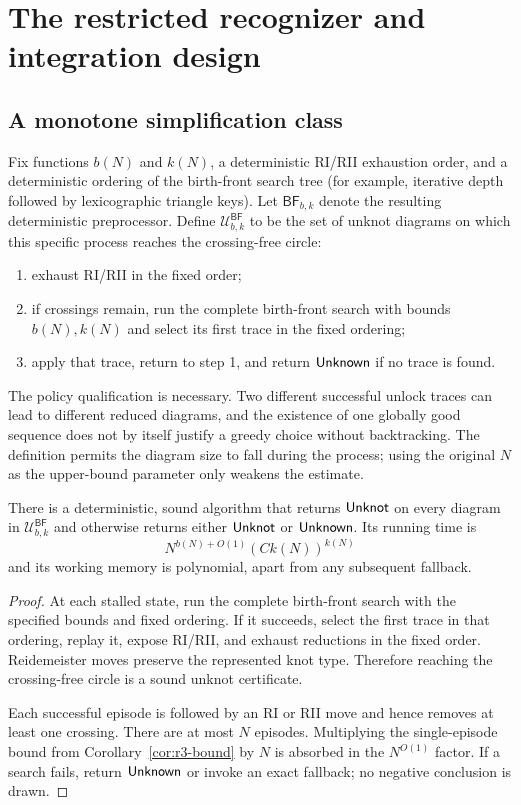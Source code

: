\section{The restricted recognizer and integration design}
\label{sec:algorithm}

\subsection{A monotone simplification class}

Fix functions $b(N)$ and $k(N)$, a deterministic RI/RII exhaustion order,
and a deterministic ordering of the birth-front search tree (for example,
iterative depth followed by lexicographic triangle keys).  Let
$\mathsf{BF}_{b,k}$ denote the resulting deterministic preprocessor.  Define
$\mathcal{U}^{\mathsf{BF}}_{b,k}$ to be the set of unknot diagrams on which this
specific process reaches the crossing-free circle:
\begin{enumerate}
\item exhaust RI/RII in the fixed order;
\item if crossings remain, run the complete birth-front search with bounds
      $b(N),k(N)$ and select its first trace in the fixed ordering;
\item apply that trace, return to step 1, and return $\mathsf{Unknown}$ if no trace is
      found.
\end{enumerate}
The policy qualification is necessary.  Two different successful unlock traces
can lead to different reduced diagrams, and the existence of one globally good
sequence does not by itself justify a greedy choice without backtracking.  The
definition permits the diagram size to fall during the process; using the
original $N$ as the upper-bound parameter only weakens the estimate.

\begin{theorem}
\label{thm:restricted-recognition}
There is a deterministic, sound algorithm that returns $\mathsf{Unknot}$ on every diagram
in $\mathcal{U}^{\mathsf{BF}}_{b,k}$ and otherwise returns either $\mathsf{Unknot}$ or $\mathsf{Unknown}$.  Its
running time is
\[
  N^{b(N)+O(1)}(Ck(N))^{k(N)}
\]
and its working memory is polynomial, apart from any subsequent fallback.
\end{theorem}

\begin{proof}
At each stalled state, run the complete birth-front search with the specified
bounds and fixed ordering.  If it succeeds, select the first trace in that
ordering, replay it, expose RI/RII, and exhaust reductions in the fixed order.  Reidemeister moves preserve the represented
knot type.  Therefore reaching the crossing-free circle is a sound unknot
certificate.

Each successful episode is followed by an RI or RII move and hence removes at
least one crossing.  There are at most $N$ episodes.  Multiplying the
single-episode bound from Corollary~\ref{cor:r3-bound} by $N$ is absorbed in the
$N^{O(1)}$ factor.  If a search fails, return $\mathsf{Unknown}$ or invoke an exact
fallback; no negative conclusion is drawn.
\end{proof}

